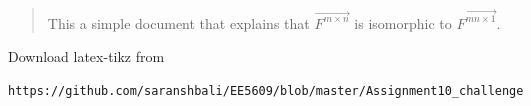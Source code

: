 \documentclass[journal,12pt,twocolumn]{IEEEtran}
\begin{document}
% 
\maketitle
\newpage
\bigskip
\renewcommand{\thefigure}{\theenumi}
\renewcommand{\thetable}{\theenumi}
%
%
\begin{abstract}
This a simple document that explains that $\vec{F^{m\times n}}$ is isomorphic to $\vec{F^{mn \times 1}}$.
\end{abstract}
Download latex-tikz from
\begin{lstlisting}
https://github.com/saranshbali/EE5609/blob/master/Assignment10_challenge
\end{lstlisting}
%
\end{document}
